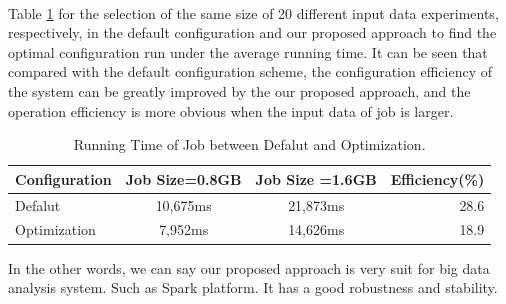     ~ %
    ~ %

\par Table \ref{tab:runningtimecompare} for the selection of the same size of 20 different input data experiments, respectively, in the default configuration and our proposed approach to find the optimal configuration run under the average running time. It can be seen that compared with the default configuration scheme, the configuration efficiency of the system can be greatly improved by the our proposed approach, and the operation efficiency is more obvious when the input data of job is larger. 
\begin{table}[!htbp]
\centering
\caption{Running Time of Job between Defalut and Optimization.} \label{tab:runningtimecompare} 
\begin{center}
    \begin{tabular}{l*{2}{c}r}
    \hline
    Configuration & Job Size=0.8GB & Job Size =1.6GB & Efficiency(\%) \\
    \hline
    Defalut & 10,675ms & 21,873ms & 28.6 \\
    Optimization & 7,952ms & 14,626ms & 18.9  \\
    \hline
    \end{tabular}
\end{center}
\end{table}

\par   In the other words, we can say our proposed approach is very suit for big data analysis system. Such as Spark platform. It has a good robustness and stability.

